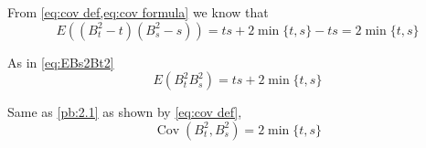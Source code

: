 \documentclass{homework}
\DeclareMathOperator{\Cov}{Cov}
\begin{document}
    \begin{subproblem}
        \item\label{pb:2.1}
        From \cref{eq:cov def,eq:cov formula} we know that
        \[E\left((B_t^2-t)(B_s^2-s)\right)=ts+2\min\{t,s\}-ts=2\min\{t,s\}\]

        \item
        As in \cref{eq:EBs2Bt2}
        \[E\left(B_t^2B_s^2\right)=ts+2\min\{t,s\}\]

        \item
        Same as \ref{pb:2.1} as shown by \cref{eq:cov def},
        \[\Cov(B_t^2,B_s^2)=2\min\{t,s\}\]
    \end{subproblem}
\end{document}
